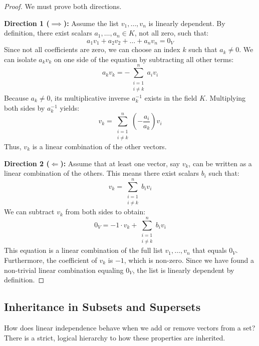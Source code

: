 \begin{proof}
We must prove both directions.

\textbf{Direction 1 ($\implies$):} 
Assume the list $v_1, \dots, v_n$ is linearly dependent. By definition, there exist scalars $a_1, \dots, a_n \in K$, not all zero, such that:
\[
a_1 v_1 + a_2 v_2 + \dots + a_n v_n = 0_V
\]
Since not all coefficients are zero, we can choose an index $k$ such that $a_k \ne 0$. We can isolate $a_k v_k$ on one side of the equation by subtracting all other terms:
\[
a_k v_k = - \sum_{\substack{i=1 \\ i \ne k}}^n a_i v_i
\]
Because $a_k \ne 0$, its multiplicative inverse $a_k^{-1}$ exists in the field $K$. Multiplying both sides by $a_k^{-1}$ yields:
\[
v_k = \sum_{\substack{i=1 \\ i \ne k}}^n \left( -\frac{a_i}{a_k} \right) v_i
\]
Thus, $v_k$ is a linear combination of the other vectors.

\textbf{Direction 2 ($\Longleftarrow$):} 
Assume that at least one vector, say $v_k$, can be written as a linear combination of the others. This means there exist scalars $b_i$ such that:
\[
v_k = \sum_{\substack{i=1 \\ i \ne k}}^n b_i v_i
\]
We can subtract $v_k$ from both sides to obtain:
\[
0_V = -1 \cdot v_k + \sum_{\substack{i=1 \\ i \ne k}}^n b_i v_i
\]
This equation is a linear combination of the full list $v_1, \dots, v_n$ that equals $0_V$. Furthermore, the coefficient of $v_k$ is $-1$, which is non-zero. Since we have found a non-trivial linear combination equaling $0_V$, the list is linearly dependent by definition.
\end{proof}

\subsection{Inheritance in Subsets and Supersets}

How does linear independence behave when we add or remove vectors from a set? There is a strict, logical hierarchy to how these properties are inherited. 


